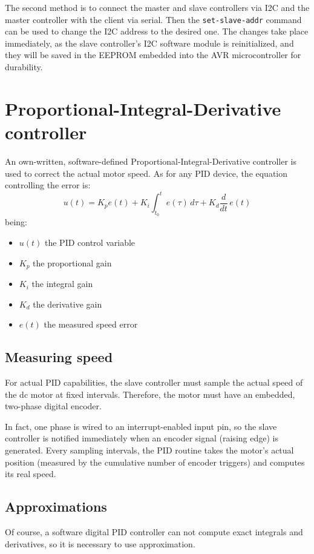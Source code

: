 The second method is to connect the master and slave controllers via I2C and
the master controller with the client via serial. Then the
\texttt{set-slave-addr} command can be used to change the I2C address to the
desired one. The changes take place immediately, as the slave controller's I2C
software module is reinitialized, and they will be saved in the EEPROM embedded
into the AVR microcontroller for durability.

\section{Proportional-Integral-Derivative controller}
An own-written, software-defined Proportional-Integral-Derivative controller is
used to correct the actual motor speed. As for any PID device, the equation
controlling the error is:
\begin{equation}
  u(t) = K_p e(t) + K_i \int_{t_0}^t e(\tau)\,d\tau + K_d \frac{d}{dt}\,e(t)
\end{equation}
being:
\begin{itemize}
  \item $u(t)$ the PID control variable
  \item $K_p$ the proportional gain
  \item $K_i$ the integral gain
  \item $K_d$ the derivative gain
  \item $e(t)$ the measured speed error
\end{itemize}

\subsection{Measuring speed}
For actual PID capabilities, the slave controller must sample the actual speed
of the dc motor at fixed intervals. Therefore, the motor must have an embedded,
two-phase digital encoder.

In fact, one phase is wired to an interrupt-enabled input pin, so the slave
controller is notified immediately when an encoder signal (raising edge) is
generated. Every sampling intervals, the PID routine takes the motor's actual
position (measured by the cumulative number of encoder triggers) and computes
its real speed.

\subsection{Approximations}
Of course, a software digital PID controller can not compute exact integrals
and derivatives, so it is necessary to use approximation.

